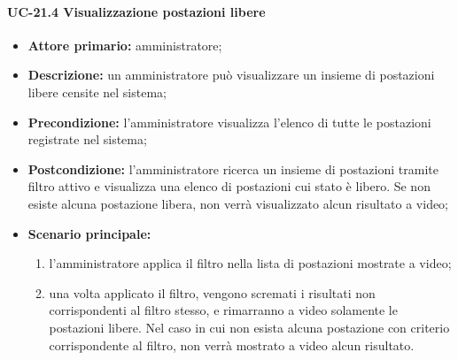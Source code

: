 \paragraph{UC-21.4 Visualizzazione postazioni libere}
\begin{itemize}
    \item \textbf{Attore primario:} amministratore;
    \item \textbf{Descrizione:} un amministratore pu\`{o} visualizzare un insieme di postazioni libere censite nel sistema;
    \item \textbf{Precondizione:} l'amministratore visualizza l'elenco di tutte le postazioni registrate nel sistema;
    \item \textbf{Postcondizione:} l'amministratore ricerca un insieme di postazioni tramite filtro attivo e visualizza una elenco di postazioni cui stato è libero. Se non esiste alcuna postazione libera, non verrà visualizzato alcun risultato a video;
    \item \textbf{Scenario principale:}
    \begin{enumerate}
        \item l'amministratore applica il filtro nella lista di postazioni mostrate a video;
        \item una volta applicato il filtro, vengono scremati i risultati non corrispondenti al filtro stesso, e rimarranno a video solamente le postazioni libere. Nel caso in cui non esista alcuna postazione con criterio corrispondente al filtro, non verrà mostrato a video alcun risultato.
    \end{enumerate}
\end{itemize}

